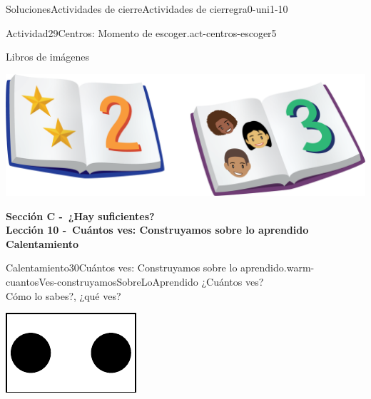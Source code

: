 \documentclass[twoside,10pt,]{article}
\begin{document}
\begin{solutions-section}{Soluciones}{Actividades de cierre}{}{Actividades de cierre}{}{}{gra0-uni1-10}
\begin{activitysolution}{Actividad}{29}{Centros: Momento de escoger.}{act-centros-escoger5}
\begin{sidebyside}{2}{0.025}{0.025}{0.05}
\begin{sbspanel}{0.45}%
Libros de imágenes%
\par
\includegraphics[width=\linewidth]{external/png-source/K.1.D Beta Student Workbooks.Books.png}
\end{sbspanel}%
\end{sidebyside}%
\end{activitysolution}%
\par\medskip
\noindent\textbf{\large{}\space\textperiodcentered\space{}Sección C -~¿Hay suficientes?\\
\space\textperiodcentered\space{}Lección 10 -~Cuántos ves: Construyamos sobre lo aprendido\\
\space\textperiodcentered\space{}Calentamiento}
\begin{explorationsolution}{Calentamiento}{30}{Cuántos ves: Construyamos sobre lo aprendido.}{warm-cuantosVes-construyamosSobreLoAprendido}%
¿Cuántos ves?\\
 Cómo lo sabes?, ¿qué ves?%
\begin{sidebyside}{2}{0}{0}{0}%
\begin{sbspanel}{0.5}%
\includegraphics[width=\linewidth]{external/svg-source/tikz-file-136323.pdf}
\end{sbspanel}%
\begin{sbspanel}{0.5}%

\end{sbspanel}
\end{sidebyside}
\end{explorationsolution}
\end{solutions-section}
\end{document}

